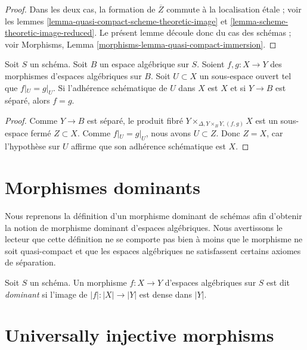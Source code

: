 \begin{proof}
Dans les deux cas, la formation de $\overline{Z}$ commute à la
localisation étale ; voir les lemmes
\ref{lemma-quasi-compact-scheme-theoretic-image} et
\ref{lemma-scheme-theoretic-image-reduced}.
Le présent lemme découle donc du cas des schémas ; voir
Morphisms, Lemma \ref{morphisms-lemma-quasi-compact-immersion}.
\end{proof}

\begin{lemma}
\label{lemma-equality-of-morphisms}
Soit $S$ un schéma. Soit $B$ un espace algébrique sur $S$.
Soient $f, g : X \to Y$ des morphismes d'espaces algébriques sur $B$.
Soit $U \subset X$ un sous-espace ouvert tel que
$f|_U = g|_U$. Si l'adhérence schématique de $U$
dans $X$ est $X$ et si $Y \to B$ est séparé, alors $f = g$.
\end{lemma}

\begin{proof}
Comme $Y \to B$ est séparé, le produit fibré
$Y \times_{\Delta, Y \times_B Y, (f, g)} X$ est un sous-espace fermé $Z \subset X$. 
Comme $f|_U = g|_U$, nous avons $U \subset Z$. Donc $Z = X$,
car l'hypothèse sur $U$ affirme que son adhérence schématique est $X$.
\end{proof}






\section{Morphismes dominants}
\label{section-dominant}

\noindent
Nous reprenons la définition d'un morphisme dominant de schémas afin d'obtenir
la notion de morphisme dominant d'espaces algébriques. Nous avertissons le
lecteur que cette définition ne se comporte pas bien à moins que le morphisme
ne soit quasi-compact et que les espaces algébriques ne satisfassent certains
axiomes de séparation.

\begin{definition}
\label{definition-dominant}
Soit $S$ un schéma. Un morphisme $f : X \to Y$ d'espaces algébriques sur $S$ est
dit {\it dominant} si l'image de $|f| : |X| \to |Y|$ est dense dans $|Y|$.
\end{definition}






\section{Universally injective morphisms}
\label{section-universally-injective}

